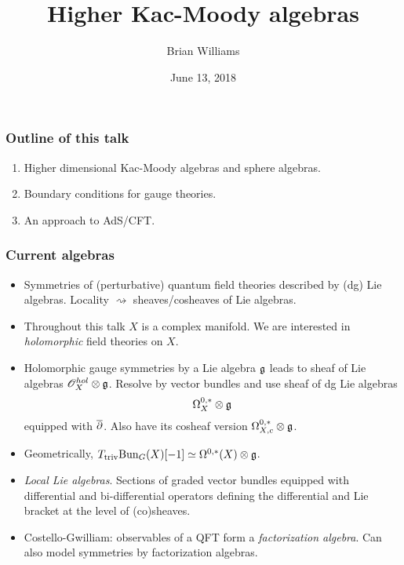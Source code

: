 \documentclass[10pt]{beamer}
\title{Higher Kac-Moody algebras}
\author{Brian Williams}
\institute{Northeastern University}
\date{June 13, 2018}
\begin{document}
\frame{\titlepage}

\begin{frame}
\frametitle{Outline of this talk}
\begin{enumerate}
\item Higher dimensional Kac-Moody algebras and sphere algebras.
\item Boundary conditions for gauge theories.
\item An approach to AdS/CFT.
\end{enumerate}
\end{frame}

\begin{frame}
\frametitle{Current algebras}

\begin{itemize}
\item Symmetries of (perturbative) quantum field theories described by (dg) Lie algebras. 
Locality $\rightsquigarrow$ sheaves/cosheaves of Lie algebras.
\item Throughout this talk $X$ is a complex manifold. 
We are interested in {\em holomorphic} field theories on $X$.
\item Holomorphic gauge symmetries by a Lie algebra $\mathfrak g$ leads to sheaf of Lie algebras $\mathscr O^{hol}_X \otimes \mathfrak g$. 
Resolve by vector bundles and use sheaf of dg Lie algebras $$\Omega^{0,*}_X \otimes \mathfrak g$$ equipped with $\overline{\partial}$. 
Also have its cosheaf version $\Omega^{0,*}_{X,c} \otimes \mathfrak g$. 
\item Geometrically, $T_{\rm triv} {\rm Bun}_G(X)[-1] \simeq \Omega^{0,*}(X) \otimes \mathfrak g$. 
\item {\em Local Lie algebras}. Sections of graded vector bundles equipped with differential and bi-differential operators defining the differential and Lie bracket at the level of (co)sheaves. 
\item Costello-Gwilliam: observables of a QFT form a {\em factorization algebra}. 
Can also model symmetries by factorization algebras. 
\end{itemize}

\end{frame}
\end{document}
